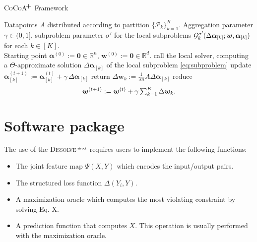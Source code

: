 \documentclass[twoside,11pt]{article}
\newcommand{\algname}{\textsc{Dissolve}$\,^{\textsf{\tiny struct}}$\xspace}
\newcommand{\cocoap}{\textsc{CoCoA$\!^{\bf \textbf{\footnotesize+}}$}\xspace}
\newcommand{\alphav}{\bm{\alpha}}
\newcommand{\vc}[2]{#1^{(#2)}}
\newcommand{\vsubset}[2]{#1_{[#2]}}
\newcommand{\Ggk}{\mathcal{G}^{\sigma'}_k\hspace{-0.08em}}
\newcommand{\aggpar}{\gamma}
\newcommand{\R}{\mathbb{R}}
\newcommand{\0}{\mathbf{0}} %
\newcommand{\weight}{w}
\newcommand{\wv}{{\bm{\weight}}}
\begin{document}
\begin{algorithm}[h]
\caption{\cocoap Framework}
\label{alg:cocoa}

\begin{algorithmic}[1]
 Datapoints $A$ distributed according to partition $\{\mathcal{P}_k\}_{k=1}^K$.
Aggregation parameter $\aggpar\!\in\!(0,1]$, 
subproblem parameter $\sigma'$ for the local subproblems
$\Ggk(  \vsubset{\Delta \alphav}{k}; \wv, \vsubset{\alphav}{k})$ for each $k\in[K]$.\\
Starting point $\vc{\alphav}{0} := \0 \in \R^n$, $\vc{\wv}{0}:=\0\in \R^d$.
     \STATE call the local solver, computing
     a $\Theta$-approximate solution 
     $\vsubset{\Delta \alphav}{k}$   
        of  the local subproblem \eqref{eq:subproblem} 
     \STATE update $\vsubset{\vc{\alphav}{t+1}}{k} := \vsubset{\vc{\alphav}{t}}{k} + \aggpar \, \vsubset{\Delta \alphav}{k}$
     \STATE return $\Delta \wv_k :=\frac1{\lambda n} A \vsubset{\Delta \alphav}{k}$ %
  \ENDFOR
  \STATE reduce\vspace{-6mm}
\begin{equation}\label{eq:primalGlobalUpdate}\vspace{-1mm}
\vc{\wv}{t+1}  := \vc{\wv}{t} +
  \aggpar \textstyle \sum_{k=1}^K \Delta \wv_k.
\end{equation}
\ENDFOR 
\end{algorithmic}
\end{algorithm}







%
\section{Software package}

The use of the \algname requires users to implement the following functions:
\begin{itemize}
\item The joint feature map $\Psi(X,Y)$ which encodes the input/output pairs.
\item The structured loss function $\Delta(Y_i,Y)$.
\item A maximization oracle which computes the most violating constraint by solving Eq. X.
\item A prediction function that computes $X$. This operation is usually performed with the maximization oracle.
\end{itemize}
\end{document}
